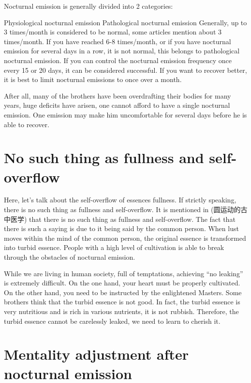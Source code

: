 \documentclass[
]{book}
\begin{document}
Nocturnal emission is generally divided into 2 categories:

Physiological nocturnal emission
Pathological nocturnal emission
Generally, up to 3 times/month is considered to be normal, some articles mention about 3 times/month. If you have reached 6-8 times/month, or if you have nocturnal emission for several days in a row, it is not normal, this belongs to pathological nocturnal emission. If you can control the nocturnal emission frequency once every 15 or 20 days, it can be considered successful. If you want to recover better, it is best to limit nocturnal emissions to once over a month.

After all, many of the brothers have been overdrafting their bodies for many years, huge deficits have arisen, one cannot afford to have a single nocturnal emission. One emission may make him uncomfortable for several days before he is able to recover.

\hypertarget{no-such-thing-as-fullness-and-self-overflow}{%
\section{No such thing as fullness and self-overflow}\label{no-such-thing-as-fullness-and-self-overflow}}

Here, let's talk about the self-overflow of essences fullness. If strictly speaking, there is no such thing as fullness and self-overflow. It is mentioned in (圆运动的古中医学) that there is no such thing as fullness and self-overflow. The fact that there is such a saying is due to it being said by the common person. When lust moves within the mind of the common person, the original essence is transformed into turbid essence. People with a high level of cultivation is able to break through the obstacles of nocturnal emission.

While we are living in human society, full of temptations, achieving ``no leaking'' is extremely difficult. On the one hand, your heart must be properly cultivated. On the other hand, you need to be instructed by the enlightened Masters. Some brothers think that the turbid essence is not good. In fact, the turbid essence is very nutritious and is rich in various nutrients, it is not rubbish. Therefore, the turbid essence cannot be carelessly leaked, we need to learn to cherish it.

\hypertarget{mentality-adjustment-after-nocturnal-emission}{%
\section{Mentality adjustment after nocturnal emission}\label{mentality-adjustment-after-nocturnal-emission}}
\end{document}
